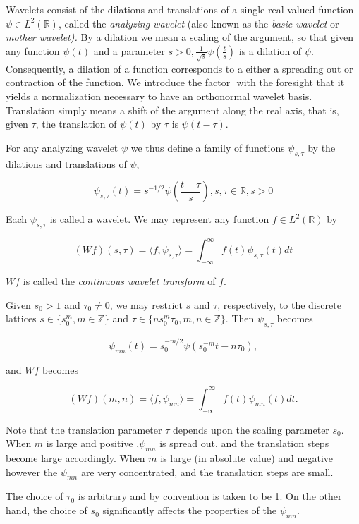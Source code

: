 \documentclass[a4paper,12pt]{article}
\begin{document}
Wavelets consist of the dilations and translations of a single real valued function \(\psi \in L^2(\mathbb{R})\), called the \emph{analyzing wavelet} (also known as the \emph{basic wavelet} or \emph{mother wavelet).} By a dilation we mean a scaling of the argument, so that given any function \(\psi(t)\) and a parameter \(s > 0, \frac{1}{\sqrt{s}} \psi(\frac{t}{s})\) is a dilation of \(\psi\). Consequently, a dilation of a function corresponds to a either a spreading out or contraction of the function. We introduce the factor \(\) with the foresight that it yields a normalization necessary to have an orthonormal wavelet basis. Translation simply means a shift of the argument along the real axis, that is, given \(\tau\), the translation of \(\psi(t)\) by \(\tau\) is \(\psi(t-\tau)\).

For any analyzing wavelet \(\psi\) we thus define a family of functions \(\psi_{s,\tau}\) by the dilations and translations of \(\psi\),

\[
\psi_{s,\tau}(t) = s^{-1/2} \psi(\frac{t-\tau}{s}), s, \tau \in \mathbb{R}, s > 0
\]

Each \(\psi_{s,\tau}\) is called a wavelet. We may represent any  function \(f \in L^2(\mathbb{R})\) by

\[
(W f)(s,\tau) = \langle f, \psi_{s,\tau} \rangle = \int_{-\infty}^{\infty} f(t) \psi_{s,\tau}(t) dt
\]

\(W f\) is called the \emph{continuous wavelet transform} of \(f\).

Given \(s_0 > 1\) and \(\tau_0 \neq 0\), we may restrict \(s\) and \(\tau\), respectively, to the discrete lattices  \(s \in \{ s_0^m, m \in \mathbb{Z}\}\) and \(\tau \in \{ n s_0^m \tau_0, m, n \in \mathbb{Z}\}\). Then \(\psi_{s,\tau}\) becomes

\[
\psi_{mn}(t) = s_0^{-m/2} \psi(s_0^{-m} t - n \tau_0),
\]

and \(W f\) becomes

\[
(W f)(m,n) = \langle f, \psi_{mn} \rangle = \int_{-\infty}^{\infty} f(t) \psi_{mn}(t) dt.
\]

Note that  the translation parameter \(\tau\) depends upon the scaling parameter \(s_0\).
When \(m\) is large and positive ,\(\psi_{mn}\) is spread out, and the translation steps become large accordingly.
When \(m\) is large (in absolute value) and negative however the \(\psi_{mn}\) are very concentrated, and the translation steps are small.

The choice of \(\tau_0\) is arbitrary and by convention is taken to be 1.
On the other hand, the choice of \(s_0\) significantly affects the properties of the \(\psi_{mn}\).
\end{document}
